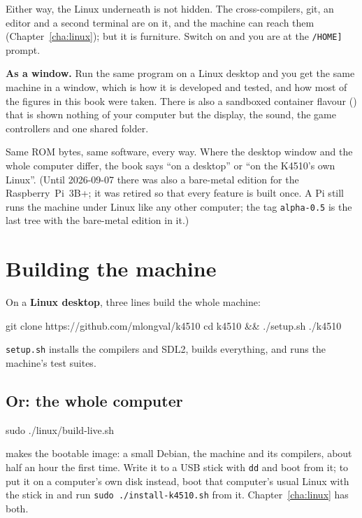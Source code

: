 Either way, the Linux underneath is not hidden. The cross-compilers,
git, an editor and a second terminal are on it, and the machine can
reach them (Chapter~\ref{cha:linux}); but it is furniture. Switch on and
you are at the \verb|/HOME]| prompt.

\textbf{As a window.} Run the same program on a Linux desktop and you
get the same machine in a window, which is how it is developed and
tested, and how most of the figures in this book were taken. There is
also a sandboxed container flavour () that is shown
nothing of your computer but the display, the sound, the game
controllers and one shared folder.

Same ROM bytes, same software, every way. Where the desktop window and
the whole computer differ, the book says ``on a desktop'' or ``on the
K4510's own Linux''. (Until 2026-09-07 there was also a bare-metal
edition for the Raspberry~Pi~3B+; it was retired so that every feature
is built once. A Pi still runs the machine under Linux like any other
computer; the tag \texttt{alpha-0.5} is the last tree with the bare-metal
edition in it.)

\section{Building the machine}
On a \textbf{Linux desktop}, three lines build the whole machine:
\begin{type}
git clone https://github.com/mlongval/k4510
cd k4510 && ./setup.sh
./k4510
\end{type}
\verb|setup.sh| installs the compilers and SDL2, builds everything, and
runs the machine's test suites.

\subsection*{Or: the whole computer}
\begin{type}
sudo ./linux/build-live.sh
\end{type}
\noindent makes the bootable image: a small Debian, the machine and its
compilers, about half an hour the first time. Write it to a USB stick
with \texttt{dd} and boot from it; to put it on a computer's own disk
instead, boot that computer's usual Linux with the stick in and run
\verb|sudo ./install-k4510.sh| from it. Chapter~\ref{cha:linux} has both.

